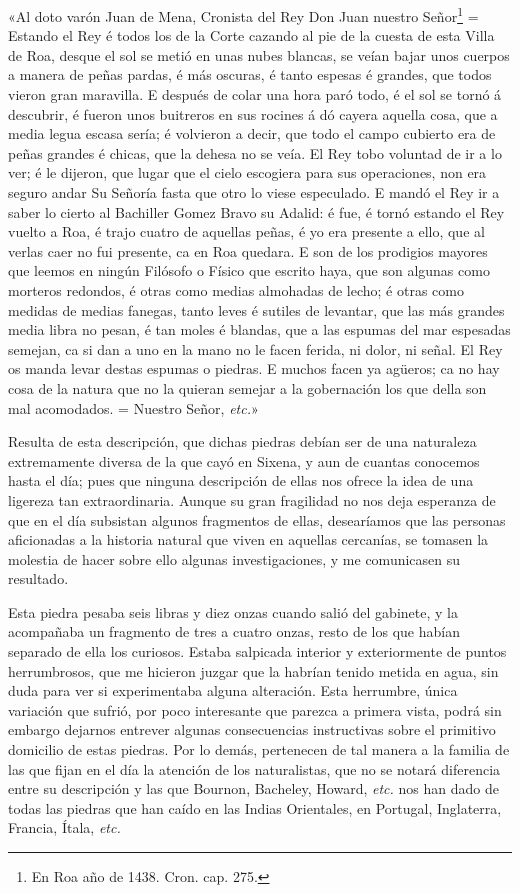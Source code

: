 \documentclass[a4paper, 12pt, oneside, spanish]{article}
\begin{document}
«Al doto varón Juan de Mena, Cronista del Rey Don Juan nuestro Señor\footnote{\Fontauri En Roa año de 1438. Cron. cap. 275.} = Estando el Rey é todos los de la Corte cazando al pie de la cuesta de esta Villa de Roa, desque el sol se metió en unas nubes blancas, se veían bajar unos cuerpos a manera de peñas pardas, é más oscuras, é tanto espesas é grandes, que todos vieron gran maravilla. E después de colar una hora paró todo, é el sol se tornó á descubrir, é fueron unos buitreros en sus rocines á dó cayera aquella cosa, que a media legua escasa sería; é volvieron a decir, que todo el campo cubierto era de peñas grandes é chicas, que la dehesa no se veía. El Rey tobo voluntad de ir a lo ver; é le dijeron, que lugar que el cielo escogiera para sus operaciones, non era seguro andar Su Señoría fasta que otro lo viese especulado. E mandó el Rey ir a saber lo cierto al Bachiller Gomez Bravo su Adalid: é fue, é tornó estando el Rey vuelto a Roa, é trajo cuatro de aquellas peñas, é yo era presente a ello, que al verlas caer no fui presente, ca en Roa quedara. E son de los prodigios mayores que leemos en ningún Filósofo o Físico que escrito haya, que son algunas como morteros redondos, é otras como medias almohadas de lecho; é otras como medidas de medias fanegas, tanto leves é sutiles de levantar, que las más grandes media libra no pesan, é tan moles é blandas, que a las espumas del mar espesadas semejan, ca si dan a uno en la mano no le facen ferida, ni dolor, ni señal. El Rey os manda levar destas espumas o piedras. E muchos facen ya agüeros; ca no hay cosa de la natura que no la quieran semejar a la gobernación los que della son mal acomodados. = Nuestro Señor, \emph{etc.}»

Resulta de esta descripción, que dichas piedras debían ser de una naturaleza extremamente diversa de la que cayó en Sixena, y aun de cuantas conocemos hasta el día; pues que ninguna descripción de ellas nos ofrece la idea de una ligereza tan extraordinaria. Aunque su gran fragilidad no nos deja esperanza de que en el día subsistan algunos fragmentos de ellas, desearíamos que las personas aficionadas a la historia natural que viven en aquellas cercanías, se tomasen la molestia de hacer sobre ello algunas investigaciones, y me comunicasen su resultado.

Esta piedra pesaba seis libras y diez onzas cuando salió del gabinete, y la acompañaba un fragmento de tres a cuatro onzas, resto de los que habían separado de ella los curiosos. Estaba salpicada interior y exteriormente de puntos herrumbrosos, que me hicieron juzgar que la habrían tenido metida en agua, sin duda para ver si experimentaba alguna alteración. Esta herrumbre, única variación que sufrió, por poco interesante que parezca a primera vista, podrá sin embargo dejarnos entrever algunas consecuencias instructivas sobre el primitivo domicilio de estas piedras. Por lo demás, pertenecen de tal manera a la familia de las que fijan en el día la atención de los naturalistas, que no se notará diferencia entre su descripción y las que Bournon, Bacheley, Howard, \emph{etc.} nos han dado de todas las piedras que han caído en las Indias Orientales, en Portugal, Inglaterra, Francia, Ítala, \emph{etc.}
\end{document}
